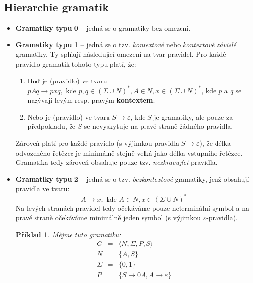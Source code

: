 \documentclass[10pt, a4paper, titlepage]{article}
\theoremstyle{note}
\newtheorem{priklad}{Příklad}
\begin{document}
\subsection{Hierarchie gramatik}
\begin{itemize}
\item
\textbf{Gramatiky typu 0} -- jedná se o gramatiky bez omezení.

\item
\textbf{Gramatiky typu 1\label{gram-1}} -- jedná se o tzv. \emph{kontextové} nebo \emph{kontextově závislé} gramatiky.
Ty splňují následující omezení na tvar pravidel. Pro každé pravidlo gramatik tohoto typu platí, že:
\begin{enumerate}
\item
Buď je (pravidlo) ve tvaru $pAq \rightarrow p x q, \text{ kde } p, q \in (\Sigma \cup N)^{*}, A \in N, x \in (\Sigma \cup N)^{*}$, kde \emph{p} a \emph{q}
se nazývají levým resp. pravým \textbf{kontextem}.

\item
Nebo je (pravidlo) ve tvaru $S \rightarrow \varepsilon$, kde $S$ je  gramatiky, ale pouze
za předpokladu, že $S$ se nevyskytuje na pravé straně žádného pravidla.
\end{enumerate}

Zároveň platí pro každé pravidlo (s výjimkou pravidla $S \rightarrow \varepsilon$), že délka odvozeného řetězce je minimálně stejně velká jako délka vstupního řetězce. Gramatika tedy zároveň obsahuje pouze tzv. \emph{nezkracující} pravidla.

\item
\textbf{Gramatiky typu 2} -- jedná se o tzv. \emph{bezkontextové} gramatiky, jenž obsahují pravidla ve tvaru:
$$
A \rightarrow x, \text{ kde } A \in N, x \in (\Sigma \cup N)^{*}
$$
Na levých stranách pravidel tedy očekáváme pouze neterminální symbol a na pravé straně očekáváme minimálně jeden symbol (s výjimkou $\varepsilon$-pravidla).

\begin{priklad}
Mějme tuto gramatiku:
\begin{eqnarray*}
G &=& \langle N, \Sigma, P, S \rangle \\
N &=& \lbrace A, S \rbrace \\
\Sigma &=& \lbrace 0, 1 \rbrace \\
P &=& \lbrace S \rightarrow 0A, A \rightarrow \varepsilon \rbrace
\end{eqnarray*}
\end{priklad}


\end{itemize}
\end{document}
